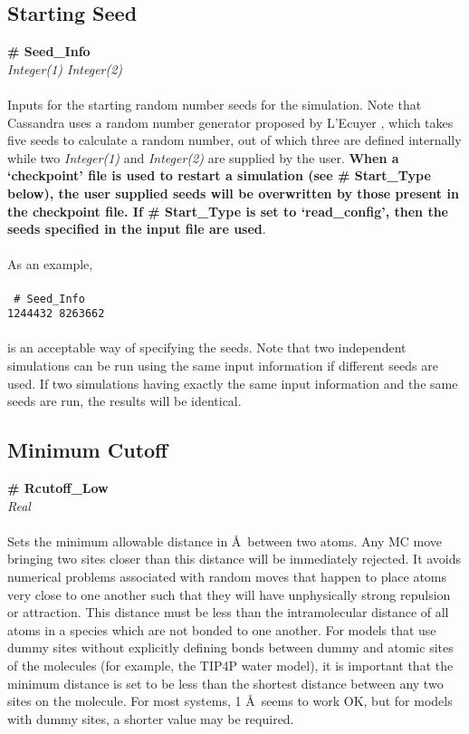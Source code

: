 \subsection{Starting Seed}\label{sec:Seed_Info}
{\bf \# Seed\_Info} \\ 
{\it Integer(1) Integer(2)} \\ \\
%
Inputs for the starting random number seeds for the simulation. Note
that Cassandra uses a random  number generator proposed by L'Ecuyer
\cite{random_gen:1999}, which takes five  
seeds to calculate a random number, out of which three are 
defined internally while two {\it Integer(1)} and {\it Integer(2)} are
supplied by the user. {\bf When a `checkpoint' file is used to restart a
simulation (see \# Start\_Type below), the user supplied seeds will be
overwritten by those present in the checkpoint file. If \# Start\_Type
is set to `read\_config', then the seeds specified in the input file are
used}.  \\ \\
As an example, \\ \\ 
\texttt{
\# Seed\_Info \\
1244432 8263662
} \\ \\
is an acceptable way of specifying the seeds. Note that two independent
simulations can be run using the same input information if different
seeds are used. If two simulations having exactly the same input
information and the same seeds are run, the results will be
identical. 
%
%
%
\subsection{Minimum Cutoff}\label{sec:Rcutoff_Low}
{\bf \# Rcutoff\_Low} \\
{\it Real} \\ \\
%
Sets the minimum allowable distance in \AA\ between two atoms. 
Any MC move bringing two sites closer than this distance will be immediately rejected. 
It avoids numerical 
problems associated with random moves that happen to place atoms very
close to one another such that they will have unphysically strong repulsion or
attraction. This distance must be less than the intramolecular
distance of all atoms in a species which are not bonded to one
another. For models that use dummy sites without explicitly defining
bonds between dummy and atomic sites of the molecules (for example,
the TIP4P water model), it is important that the minimum distance is set to be less
than the shortest distance between any two sites on the molecule. For
most systems, 1 \AA\ seems to work OK, but for models with dummy
sites, a shorter value may be required. 
%
%
